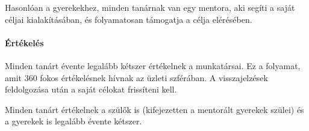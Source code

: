 Hasonlóan a gyerekekhez, minden tanárnak van egy mentora, aki segíti a saját
céljai kialakításában, és folyamatosan támogatja a célja elérésében.

\paragraph{Értékelés}

Minden tanárt évente legalább kétszer értékelnek a munkatársai. Ez a folyamat,
amit 360 fokos értékelésnek hívnak az üzleti szférában. A visszajelzések
feldolgozása után a saját célokat frissíteni kell.

Minden tanárt értékelnek a szülők is (kifejezetten a mentorált gyerekek szülei)
és a gyerekek is legalább évente kétszer.
